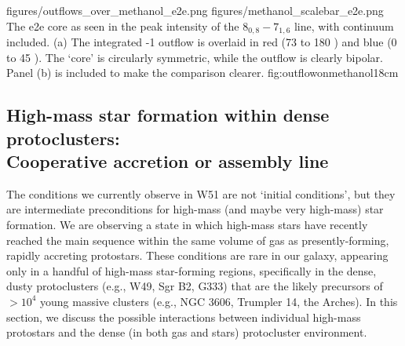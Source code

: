 \documentclass{emulateapj}
\begin{document}
 
\FigureTwo
{figures/outflows_over_methanol_e2e.png}
{figures/methanol_scalebar_e2e.png}
{The e2e core as seen in the peak intensity of the \methanol $8_{0,8}-7_{1,6}$
line, with continuum included.
(a) The integrated -1 outflow is overlaid in red (73 to 180 \kms)
and blue (0 to 45 \kms).  The `core' is circularly symmetric, while the outflow
is clearly bipolar. Panel (b) is included to make the comparison clearer.}
{fig:outflowonmethanol}{1}{8cm}


\subsection{High-mass star formation within dense protoclusters:\\
Cooperative accretion or assembly line}
\label{sec:cooperative}
The conditions we currently observe in W51 are not `initial conditions', but
they are intermediate preconditions for high-mass (and maybe very high-mass)
star formation.  We are observing a state in which high-mass stars have
recently reached the main sequence within the same volume of gas as
presently-forming, rapidly accreting protostars.  These conditions are rare in
our galaxy, appearing only in a handful of high-mass star-forming regions,
specifically in the dense, dusty protoclusters (e.g., W49, Sgr B2, G333) that
are the likely precursors of $>10^4$ \msun young massive clusters (e.g., NGC
3606, Trumpler 14, the Arches).  In this section, we discuss the possible
interactions between individual high-mass protostars and the dense (in both gas
and stars) protocluster environment.

\end{document}
